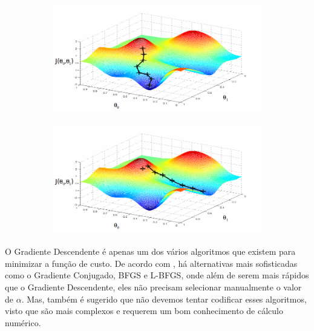 \begin{figure}
  \caption{Funcionamento do Gradiente Descendente}
  \begin{subfigure}[htb]{0.5\textwidth} \label{fig:funcgraddesc}
    \includegraphics[width=\textwidth]{img/funcgraddesc1}
  \end{subfigure}
  \begin{subfigure}[htb]{0.5\textwidth} \label{fig:funcgraddescnot}
    \includegraphics[width=\textwidth]{img/funcgraddesc2}
  \end{subfigure}

\end{figure}

O Gradiente Descendente é apenas um dos vários algoritmos que existem para minimizar a função de custo. De acordo com \cite{machinelearningcoursera}, há alternativas mais sofisticadas como o Gradiente Conjugado, BFGS e L-BFGS, onde além de serem mais rápidos que o Gradiente Descendente, eles não precisam selecionar manualmente o valor de $\alpha$. Mas, também é sugerido que não devemos tentar codificar esses algoritmos, visto que são mais complexos e requerem um bom conhecimento de cálculo numérico.


